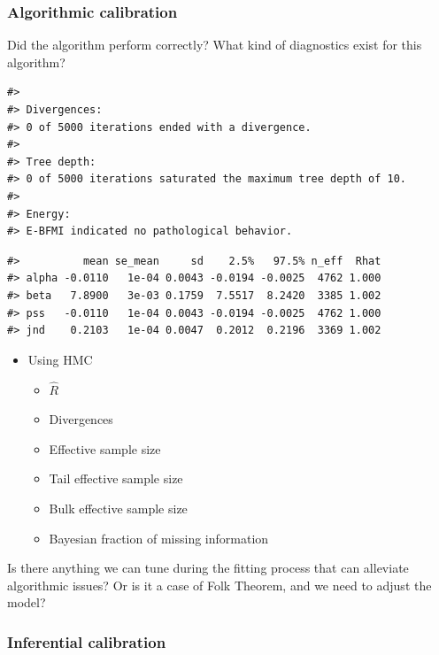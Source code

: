\documentclass[11pt, oneside, openany]{scrbook}
\providecommand{\tightlist}{%
  \setlength{\itemsep}{0pt}\setlength{\parskip}{0pt}}
\begin{document}

\hypertarget{algorithmic-calibration}{%
\subsubsection{Algorithmic calibration}\label{algorithmic-calibration}}

Did the algorithm perform correctly? What kind of diagnostics exist for this algorithm?


\begin{verbatim}
#> 
#> Divergences:
#> 0 of 5000 iterations ended with a divergence.
#> 
#> Tree depth:
#> 0 of 5000 iterations saturated the maximum tree depth of 10.
#> 
#> Energy:
#> E-BFMI indicated no pathological behavior.
\end{verbatim}


\begin{verbatim}
#>          mean se_mean     sd    2.5%   97.5% n_eff  Rhat
#> alpha -0.0110   1e-04 0.0043 -0.0194 -0.0025  4762 1.000
#> beta   7.8900   3e-03 0.1759  7.5517  8.2420  3385 1.002
#> pss   -0.0110   1e-04 0.0043 -0.0194 -0.0025  4762 1.000
#> jnd    0.2103   1e-04 0.0047  0.2012  0.2196  3369 1.002
\end{verbatim}

\begin{itemize}
\tightlist
\item
  Using HMC

  \begin{itemize}
  \tightlist
  \item
    \(\hat{R}\)
  \item
    Divergences
  \item
    Effective sample size
  \item
    Tail effective sample size
  \item
    Bulk effective sample size
  \item
    Bayesian fraction of missing information
  \end{itemize}
\end{itemize}

Is there anything we can tune during the fitting process that can alleviate algorithmic issues? Or is it a case of Folk Theorem, and we need to adjust the model?

\hypertarget{inferential-calibration}{%
\subsubsection{Inferential calibration}\label{inferential-calibration}}
\end{document}
